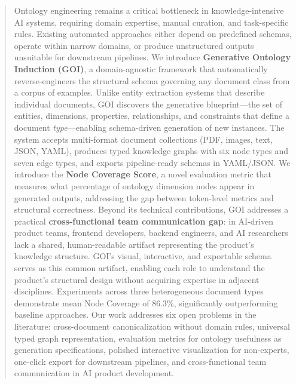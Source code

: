 \documentclass[runningheads,a4paper]{llncs}
\begin{document}
\begin{abstract}
Ontology engineering remains a critical bottleneck in
knowledge-intensive AI systems, requiring domain expertise, manual
curation, and task-specific rules. Existing automated approaches either
depend on predefined schemas, operate within narrow domains, or produce
unstructured outputs unsuitable for downstream pipelines. We introduce
\textbf{Generative Ontology Induction (GOI)}, a domain-agnostic
framework that automatically reverse-engineers the structural schema
governing any document class from a corpus of examples. Unlike entity
extraction systems that describe individual documents, GOI discovers the
generative blueprint---the set of entities, dimensions, properties,
relationships, and constraints that define a document \emph{type}---enabling
schema-driven generation of new instances. The system accepts
multi-format document collections (PDF, images, text, JSON, YAML),
produces typed knowledge graphs with six node types and seven edge types,
and exports pipeline-ready schemas in YAML/JSON. We introduce the
\textbf{Node Coverage Score}, a novel evaluation metric that measures
what percentage of ontology dimension nodes appear in generated outputs,
addressing the gap between token-level metrics and structural
correctness. Beyond its technical contributions, GOI addresses a
practical \textbf{cross-functional team communication gap}: in
AI-driven product teams, frontend developers, backend engineers, and AI
researchers lack a shared, human-readable artifact representing the
product's knowledge structure. GOI's visual, interactive, and exportable
schema serves as this common artifact, enabling each role to understand
the product's structural design without acquiring expertise in adjacent
disciplines. Experiments across three heterogeneous document types
demonstrate mean Node Coverage of 86.3\%, significantly outperforming
baseline approaches. Our work addresses six open problems in the
literature: cross-document canonicalization without domain rules,
universal typed graph representation, evaluation metrics for ontology
usefulness as generation specifications, polished interactive
visualization for non-experts, one-click export for downstream
pipelines, and cross-functional team communication in AI product
development.

\end{abstract}
\end{document}
